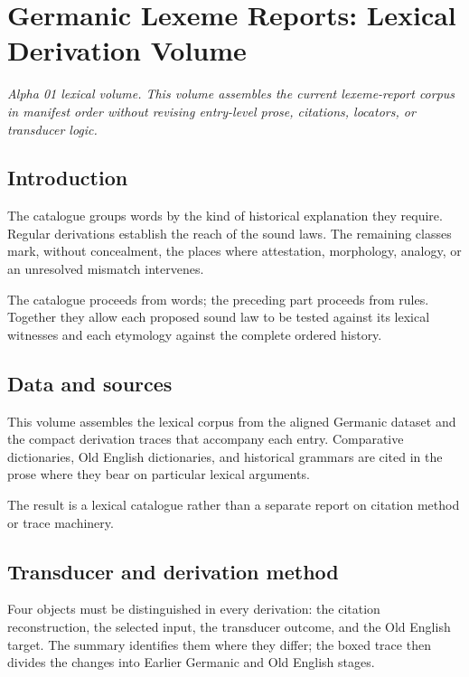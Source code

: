 \documentclass[
  british,
  a4paper,
]{article}
\author{}
\date{}
\begin{document}
\section{Germanic Lexeme Reports: Lexical Derivation
Volume}\label{germanic-lexeme-reports-lexical-derivation-volume}

\emph{Alpha 01 lexical volume. This volume assembles the current
lexeme-report corpus in manifest order without revising entry-level
prose, citations, locators, or transducer logic.}

\subsection{Introduction}\label{introduction}

The catalogue groups words by the kind of historical explanation they
require. Regular derivations establish the reach of the sound laws. The
remaining classes mark, without concealment, the places where
attestation, morphology, analogy, or an unresolved mismatch intervenes.

The catalogue proceeds from words; the preceding part proceeds from
rules. Together they allow each proposed sound law to be tested against
its lexical witnesses and each etymology against the complete ordered
history.

\subsection{Data and sources}\label{data-and-sources}

This volume assembles the lexical corpus from the aligned Germanic
dataset and the compact derivation traces that accompany each entry.
Comparative dictionaries, Old English dictionaries, and historical
grammars are cited in the prose where they bear on particular lexical
arguments.

The result is a lexical catalogue rather than a separate report on
citation method or trace machinery.

\subsection{Transducer and derivation
method}\label{transducer-and-derivation-method}

Four objects must be distinguished in every derivation: the citation
reconstruction, the selected input, the transducer outcome, and the Old
English target. The summary identifies them where they differ; the boxed
trace then divides the changes into Earlier Germanic and Old English
stages.
\end{document}
